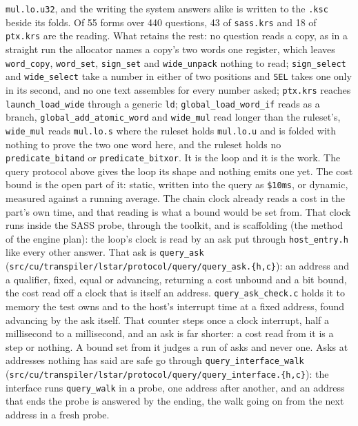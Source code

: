 \begin{enumerate}
\texttt{mul.\allowbreak{}lo.\allowbreak{}u32}, and the writing the system answers alike is written to the \texttt{.\allowbreak{}ksc} beside its folds. Of 55 forms over 440 questions, 43 of \texttt{sass.\allowbreak{}krs} and 18 of \texttt{ptx.\allowbreak{}krs} are the reading. What retains the rest: no question reads a copy, as in a straight run the allocator names a copy's two words one register, which leaves \texttt{word\_\allowbreak{}copy}, \texttt{word\_\allowbreak{}set}, \texttt{sign\_\allowbreak{}set} and \texttt{wide\_\allowbreak{}unpack} nothing to read; \texttt{sign\_\allowbreak{}select} and \texttt{wide\_\allowbreak{}select} take a number in either of two positions and \texttt{SEL} takes one only in its second, and no one text assembles for every number asked; \texttt{ptx.\allowbreak{}krs} reaches \texttt{launch\_\allowbreak{}load\_\allowbreak{}wide} through a generic \texttt{ld}; \texttt{global\_\allowbreak{}load\_\allowbreak{}word\_\allowbreak{}if} reads as a branch, \texttt{global\_\allowbreak{}add\_\allowbreak{}atomic\_\allowbreak{}word} and \texttt{wide\_\allowbreak{}mul} read longer than the ruleset's, \texttt{wide\_\allowbreak{}mul} reads \texttt{mul.\allowbreak{}lo.\allowbreak{}s} where the ruleset holds \texttt{mul.\allowbreak{}lo.\allowbreak{}u} and is folded with nothing to prove the two one word here, and the ruleset holds no \texttt{predicate\_\allowbreak{}bitand} or \texttt{predicate\_\allowbreak{}bitxor}. It is the loop and it is the work. The query protocol above gives the loop its shape and nothing emits one yet. The cost bound is the open part of it: static, written into the query as \texttt{\$10ms}, or dynamic, measured against a running average. The chain clock already reads a cost in the part's own time, and that reading is what a bound would be set from. That clock runs inside the SASS probe, through the toolkit, and is scaffolding (the method of the engine plan): the loop's clock is read by an ask put through \texttt{host\_\allowbreak{}entry.\allowbreak{}h} like every other answer. That ask is \texttt{query\_\allowbreak{}ask} (\texttt{src/\allowbreak{}cu/\allowbreak{}transpiler/\allowbreak{}lstar/\allowbreak{}protocol/\allowbreak{}query/\allowbreak{}query\_\allowbreak{}ask.\allowbreak{}\{h,c\}}): an address and a qualifier, fixed, equal or advancing, returning a cost unbound and a bit bound, the cost read off a clock that is itself an address. \texttt{query\_\allowbreak{}ask\_\allowbreak{}check.\allowbreak{}c} holds it to memory the test owns and to the host's interrupt time at a fixed address, found advancing by the ask itself. That counter steps once a clock interrupt, half a millisecond to a millisecond, and an ask is far shorter: a cost read from it is a step or nothing. A bound set from it judges a run of asks and never one. Asks at addresses nothing has said are safe go through \texttt{query\_\allowbreak{}interface\_\allowbreak{}walk} (\texttt{src/\allowbreak{}cu/\allowbreak{}transpiler/\allowbreak{}lstar/\allowbreak{}protocol/\allowbreak{}query/\allowbreak{}query\_\allowbreak{}interface.\allowbreak{}\{h,c\}}): the interface runs \texttt{query\_\allowbreak{}walk} in a probe, one address after another, and an address that ends the probe is answered by the ending, the walk going on from the next address in a fresh probe. 
\end{enumerate}
